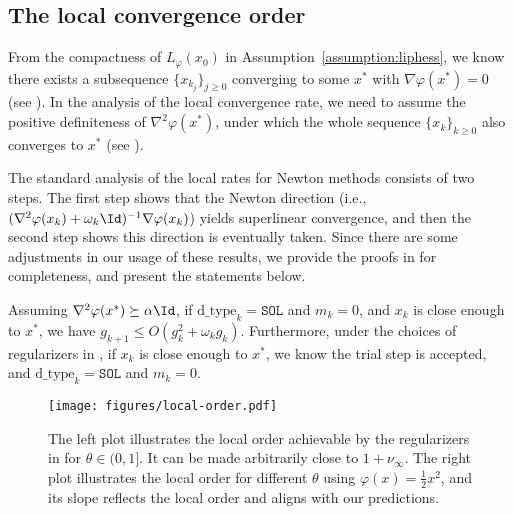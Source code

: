 
\subsection{The local convergence order} \label{sec:main/boosting-local-rates}

From the compactness of $L_\varphi(x_0)$ in Assumption~\ref{assumption:liphess}, we know there exists a subsequence $\{ x_{k_j} \}_{j \geq 0}$ converging to some $x^*$ with $\nabla\varphi(x^*) = 0$ (see ).
In the analysis of the local convergence rate, we need to assume the positive definiteness of $\nabla^2\varphi(x^*)$,
under which the whole sequence $\{x_k\}_{k\ge 0}$ also converges to $x^*$ (see ).

The standard analysis of the local rates for Newton methods consists of two steps.
The first step shows that the Newton direction (i.e., $(\nabla^2 \varphi(x_k) + \omega_k \Id)^{-1} \nabla \varphi(x_k)$) yields superlinear convergence, and then the second step shows this direction is eventually taken.
Since there are some adjustments in our usage of these results, 
we provide the proofs in  for completeness, 
and present the statements below.

\begin{lemma}%
    \label{lem:main/asymptotic-newton-properties}
    Assuming $\nabla^2\varphi(x^*) \succeq \alpha \Id$,
    if $\text{d\_type}_k = \texttt{SOL}$ and $m_k = 0$,
    and $x_k$ is close enough to $x^*$, we have 
    $g_{k+1} \leq O(g_k^2 + \omega_k g_k)$.
    Furthermore, under the choices of regularizers in ,
    if $x_k$ is close enough to $x^*$,
    we know the trial step is accepted, and $\text{d\_type}_k = \texttt{SOL}$ and $m_k = 0$.
\end{lemma}


\begin{figure}[tbp]
    \centering
    \texttt{[image: figures/local-order.pdf]}
    \caption{
        The left plot illustrates the local order achievable by the regularizers in  for $\theta \in (0, 1]$.
        It can be made arbitrarily close to $1 + \nu_\infty$. 
        The right plot illustrates the local order for different $\theta$ using $\varphi(x) = \frac{1}{2}x^2$,
        and its slope reflects the local order and aligns with our predictions.
        }
    \label{fig:local-rate-for-nu1}
\end{figure}

